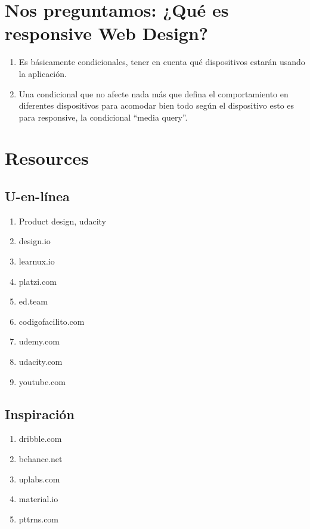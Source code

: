 \section{\textbf{Nos preguntamos:} ¿Qué es responsive Web Design?}
\begin{enumerate}
    \item Es básicamente condicionales, tener en cuenta qué dispositivos estarán usando la aplicación.
    \item Una condicional que no afecte nada más que defina el comportamiento en diferentes dispositivos para acomodar bien todo según el dispositivo esto es para responsive, la condicional ``media query''.
\end{enumerate}
\section{Resources}
\subsection{U-en-línea}
\begin{enumerate}
    \item Product design, udacity
    \item design.io
    \item learnux.io 
    \item platzi.com 
    \item ed.team 
    \item codigofacilito.com 
    \item udemy.com 
    \item udacity.com 
    \item youtube.com 
\end{enumerate}
\subsection{Inspiración}
\begin{enumerate}
    \item dribble.com 
    \item behance.net 
    \item uplabs.com 
    \item material.io 
    \item pttrns.com 
\end{enumerate}
